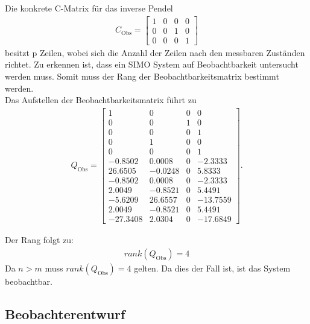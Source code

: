 \newline
Die konkrete C-Matrix für das inverse Pendel
\begin{align}
    C_{\mathrm{Obs}} = 
    \begin{bmatrix}
        1 & 0 & 0 & 0 \\
        0 & 0 & 1 & 0 \\
        0 & 0 & 0 & 1
    \end{bmatrix}
\end{align}
\newline
besitzt p Zeilen, wobei sich die Anzahl der Zeilen nach den messbaren Zuständen richtet. Zu erkennen ist, dass ein SIMO System auf Beobachtbarkeit untersucht werden muss. Somit muss der Rang der Beobachtbarkeitsmatrix bestimmt werden.\\
Das Aufstellen der Beobachtbarkeitsmatrix führt zu
\begin{align}
    Q_{\mathrm{Obs}} = 
    \begin{bmatrix}
        1 & 0 & 0 & 0 \\
        0 & 0 & 1 & 0 \\
        0 & 0 & 0 & 1 \\
        0 & 1 & 0 & 0 \\
        0 & 0 & 0 & 1 \\
        -0.8502 & 0.0008 & 0 & -2.3333 \\
       26.6505 & -0.0248 & 0 & 5.8333 \\
       -0.8502 & 0.0008 & 0 & -2.3333 \\
        2.0049 & -0.8521 & 0 & 5.4491 \\
       -5.6209 & 26.6557 & 0 & -13.7559 \\
        2.0049 & -0.8521 & 0 & 5.4491 \\
      -27.3408 & 2.0304 & 0 & -17.6849
    \end{bmatrix}.
\end{align}

Der Rang folgt zu:
\begin{align}
    rank(Q_{\mathrm{Obs}}) = 4
\end{align}
\newline
Da $n > m$ muss $rank(Q_{\mathrm{Obs}}) = 4$ gelten. Da dies der Fall ist, ist das System beobachtbar.

\subsection{Beobachterentwurf}

